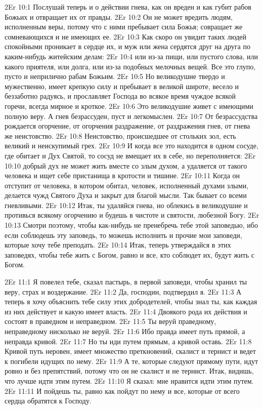 \vs 2Er 10:1
Послушай теперь и о
действии гнева, как он вреден и как губит рабов Божьих и отвращает их от
правды.
\vs 2Er 10:2
Он не может вредить людям,
исполненным веры, потому что с ними пребывает сила Божья; совращает же
сомневающихся и не имеющих ее.
\vs 2Er 10:3
Как скоро он увидит таких
людей спокойными проникает в сердце их, и муж или жена сердятся друг на
друга по каким-нибудь житейским делам:
\vs 2Er 10:4
или из-за пищи, или
пустого слова, или какого приятеля, или долга, или из-за подобных мелочных
вещей. Все это глупо, пусто и неприлично рабам Божьим.
\vs 2Er 10:5
Но великодушие твердо и
мужественно, имеет крепкую силу и пребывает в великой широте, весело и
беззаботно радуясь, и прославляет Господа во всякое время чуждое всякой
горечи, всегда мирное и кроткое.
\vs 2Er 10:6
Это великодушие живет с
имеющими полную веру. А гнев безрассуден, пуст и легкомыслен.
\vs 2Er 10:7
От безрассудства рождается
огорчение, от огорчения раздражение, от раздражения гнев, от гнева же
неистовство.
\vs 2Er 10:8
Неистовство, происшедшее
от стольких зол, есть великий и неискупимый грех.
\vs 2Er 10:9
И когда все это находится
в одном сосуде, где обитает и Дух Святой, то сосуд не вмещает их в себе, но
переполняется:
\vs 2Er 10:10
добрый дух не может жить
вместе со злым духом, а удаляется от такого человека и ищет себе пристанища в
кротости и тишине.
\vs 2Er 10:11
Когда он отступит от
человека, в котором обитал, человек, исполненный духами злыми, делается чужд
Святого Духа и закрыт для благой мысли. Так бывает со всеми гневливыми.
\vs 2Er 10:12
Итак, ты удаляйся гнева,
но облекись в великодушие и противься всякому огорчению и будешь в чистоте и
святости, любезной Богу.
\vs 2Er 10:13
Смотри поэтому, чтобы
как-нибудь не пренебречь тебе этой заповедью, ибо если соблюдешь эту заповедь,
то можешь исполнить и прочие мои заповеди, которые хочу тебе преподать.
\vs 2Er 10:14
Итак, теперь утверждайся
в этих заповедях, чтобы тебе жить с Богом, равно и все, кто соблюдет их,
будут жить с Богом.

\vs 2Er 11:1
Я повелел тебе, сказал пастырь, в первой заповеди, чтобы хранил ты веру,
страх и воздержание.
\vs 2Er 11:2
Да, господин, подтвердил
я.
\vs 2Er 11:3
А теперь я хочу объяснить
тебе силу этих добродетелей, чтобы знал ты, как каждая из них действует и
какую имеет власть.
\vs 2Er 11:4
Двоякого рода их действия
и состоят в праведном и неправедном.
\vs 2Er 11:5
Ты веруй праведному,
неправедному нисколько не веруй.
\vs 2Er 11:6
Ибо правда имеет путь
прямой, а неправда кривой.
\vs 2Er 11:7
Но ты иди путем прямым, а
кривой оставь.
\vs 2Er 11:8
Кривой путь неровен, имеет
множество преткновений, скалист и тернист и ведет к погибели идущих по нему.
\vs 2Er 11:9
А те, которые следуют
прямому пути, идут ровно и без препятствий, потому что он не скалист и не
тернист. Итак, видишь, что лучше идти этим путем.
\vs 2Er 11:10
Я сказал: мне нравится
идти этим путем.
\vs 2Er 11:11
И пойдешь ты, равно как
пойдут по нему и все, которые от всего сердца обратятся к Господу.

